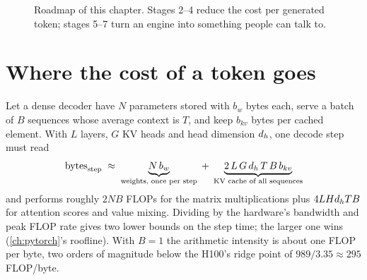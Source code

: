 \begin{figure}[t]
\centering
{}
\caption{Roadmap of this chapter. Stages 2--4 reduce the cost per generated token;
stages 5--7 turn an engine into something people can talk to.}
\label{fig:efficient:roadmap}
\end{figure}

\section{Where the cost of a token goes}\label{sec:efficient:cost}

Let a dense decoder have $N$ parameters stored with $b_w$ bytes each, serve a batch of
$B$ sequences whose average context is $T$, and keep $b_{kv}$ bytes per cached element.
With $L$ layers, $G$ KV heads and head dimension $d_{h}$, one decode step must read
\begin{equation}
  \text{bytes}_{\text{step}} \;\approx\;
  \underbrace{N\,b_w}_{\text{weights, once per step}} \;+\;
  \underbrace{2\,L\,G\,d_{h}\,T\,B\,b_{kv}}_{\text{KV cache of all sequences}}
  \label{eq:efficient:bytes}
\end{equation}
and performs roughly $2NB$ FLOPs for the matrix multiplications plus $4 L H d_{h} T B$
for attention scores and value mixing. Dividing by the hardware's bandwidth and peak FLOP
rate gives two lower bounds on the step time; the larger one wins (\cref{ch:pytorch}'s
roofline). With $B=1$ the arithmetic intensity is about one FLOP per byte, two orders of
magnitude below the H100's ridge point of $989/3.35\approx 295$ FLOP/byte.

